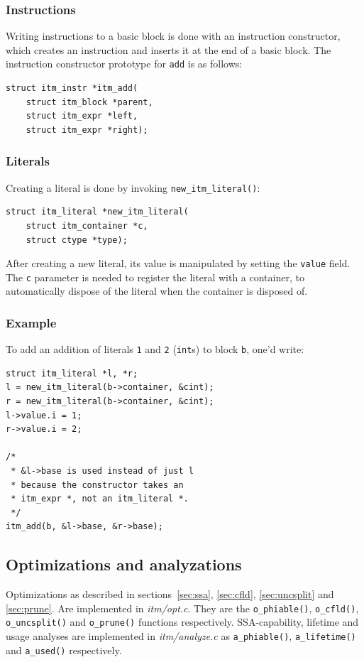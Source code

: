 \documentclass[12pt, a4paper]{article}
\begin{document}
\subsubsection{Instructions}
Writing instructions to a basic block is done with an instruction constructor,
which creates an instruction and inserts it at the end of a basic block. The
instruction constructor prototype for \verb+add+ is as follows:

\begin{lstlisting}
struct itm_instr *itm_add(
	struct itm_block *parent,
	struct itm_expr *left,
	struct itm_expr *right);
\end{lstlisting}

\subsubsection{Literals}
Creating a literal is done by invoking \verb+new_itm_literal()+:

\begin{lstlisting}
struct itm_literal *new_itm_literal(
	struct itm_container *c,
	struct ctype *type);
\end{lstlisting}

After creating a new literal, its value is manipulated by setting the
\verb+value+ field. The \verb+c+ parameter is needed to register the literal
with a container, to automatically dispose
of the literal when the container is disposed of.

\subsubsection{Example}
To add an addition of literals \verb+1+ and \verb+2+ (\verb+int+s) to block
\verb+b+, one'd write:

\begin{lstlisting}
struct itm_literal *l, *r;
l = new_itm_literal(b->container, &cint);
r = new_itm_literal(b->container, &cint);
l->value.i = 1;
r->value.i = 2;

/*
 * &l->base is used instead of just l
 * because the constructor takes an
 * itm_expr *, not an itm_literal *.
 */
itm_add(b, &l->base, &r->base);
\end{lstlisting}


\subsection{Optimizations and analyzations}
Optimizations as described in sections~\ref{sec:ssa}, \ref{sec:cfld},
\ref{sec:uncsplit} and \ref{sec:prune}. Are implemented in \textit{itm/opt.c}.
They are the \verb+o_phiable()+, \verb+o_cfld()+, \verb+o_uncsplit()+ and
\verb+o_prune()+ functions respectively. SSA-capability, lifetime and usage
analyses are implemented in \textit{itm/analyze.c} as \verb+a_phiable()+,
\verb+a_lifetime()+ and \verb+a_used()+ respectively.
\end{document}
